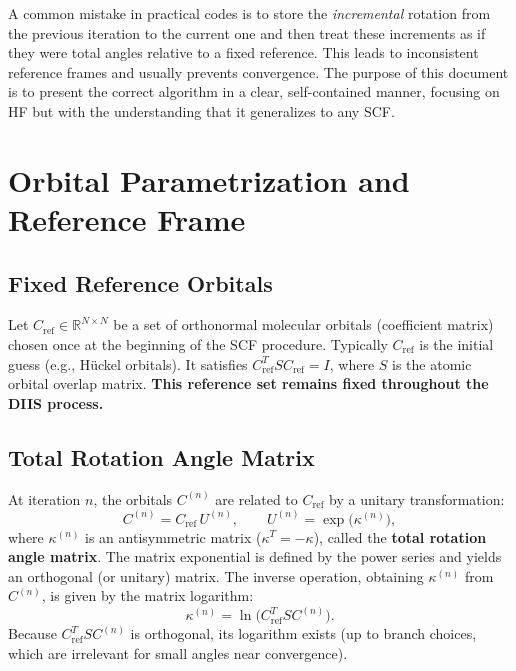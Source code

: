 \documentclass[12pt,a4paper]{article}
\begin{document}
A common mistake in practical codes is to store the \emph{incremental} rotation from the previous iteration to the current one and then treat these increments as if they were total angles relative to a fixed reference. This leads to inconsistent reference frames and usually prevents convergence. The purpose of this document is to present the correct algorithm in a clear, self-contained manner, focusing on HF but with the understanding that it generalizes to any SCF.

\section{Orbital Parametrization and Reference Frame}

\subsection{Fixed Reference Orbitals}
Let $C_{\text{ref}} \in \mathbb{R}^{N \times N}$ be a set of orthonormal molecular orbitals (coefficient matrix) chosen once at the beginning of the SCF procedure. Typically $C_{\text{ref}}$ is the initial guess (e.g., Hückel orbitals). It satisfies $C_{\text{ref}}^T S C_{\text{ref}} = I$, where $S$ is the atomic orbital overlap matrix. \textbf{This reference set remains fixed throughout the DIIS process.}

\subsection{Total Rotation Angle Matrix}
At iteration $n$, the orbitals $C^{(n)}$ are related to $C_{\text{ref}}$ by a unitary transformation:
\begin{equation}
C^{(n)} = C_{\text{ref}} \, U^{(n)}, \qquad U^{(n)} = \exp\bigl(\kappa^{(n)}\bigr),
\end{equation}
where $\kappa^{(n)}$ is an antisymmetric matrix ($\kappa^T = -\kappa$), called the \textbf{total rotation angle matrix}. The matrix exponential is defined by the power series and yields an orthogonal (or unitary) matrix. The inverse operation, obtaining $\kappa^{(n)}$ from $C^{(n)}$, is given by the matrix logarithm:
\begin{equation}
\kappa^{(n)} = \ln\!\bigl(C_{\text{ref}}^T S C^{(n)}\bigr).
\end{equation}
Because $C_{\text{ref}}^T S C^{(n)}$ is orthogonal, its logarithm exists (up to branch choices, which are irrelevant for small angles near convergence).
\end{document}
